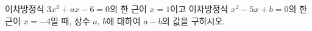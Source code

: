 이차방정식 $3x^2+ax-6=0$의 한 근이 $x=1$이고 이차방정식 $x^2-5x+b=0$의 한 근이 $x=-4$일 때, 상수 $a$, $b$에 대하여 $a-b$의 값을 구하시오.
